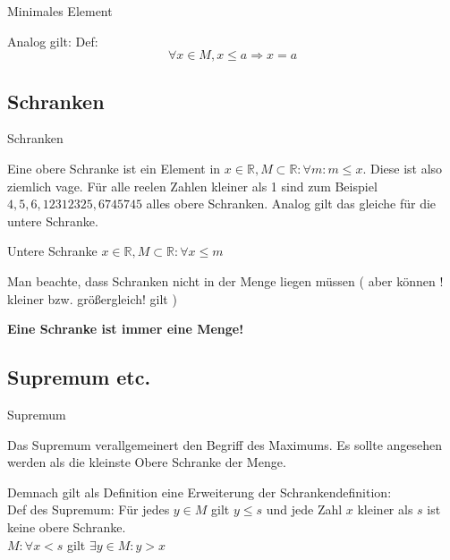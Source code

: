 \documentclass[headsepline,12pt,a4paper]{scrartcl}
\begin{document}
\begin{center}
\item[Minimales Element]
\end{center}
\item Analog gilt: Def: $$ \forall x \in M, x \leq a \Rightarrow x = a $$

\newpage

\subsection*{Schranken}

\begin{center}
\item[Schranken]
\end{center}
\item Eine obere Schranke ist ein Element in $ x \in \mathbb{R}, M \subset \mathbb{R} : \forall m : m \leq x $. Diese ist also ziemlich vage. Für alle reelen Zahlen kleiner als 1 sind zum Beispiel $ 4,5,6,12312325,6745745 $ alles obere Schranken. Analog gilt das gleiche für die untere Schranke.
\item Untere Schranke $ x \in \mathbb{R}, M \subset \mathbb{R} : \forall x \leq m $
\item Man beachte, dass Schranken nicht in der Menge liegen müssen ( aber können ! kleiner bzw. größergleich! gilt )
\item \textbf{Eine Schranke ist immer eine Menge!}

\subsection*{Supremum etc.}

\begin{center}
\item[Supremum]
\end{center}
\item Das Supremum verallgemeinert den Begriff des Maximums. Es sollte angesehen werden als die kleinste Obere Schranke der Menge.
\item Demnach gilt als Definition eine Erweiterung der Schrankendefinition:\\

Def des Supremum:
Für jedes $ y \in M $ gilt $ y \leq s $
und jede Zahl $x$ kleiner als $s$ ist keine obere Schranke. \\
$ M: \forall x < s $ gilt $ \exists y \in M : y > x $ \\
\end{document}
